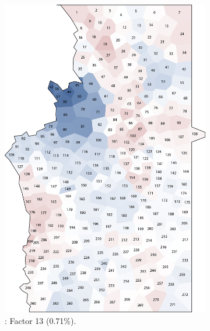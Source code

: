 \documentclass[output=paper]{LSP/langsci}
\begin{document}
\begin{figure}
\begin{subfigure}[t]{0.3\textwidth}
\includegraphics[width=\textwidth]{illustrations/pickl_fig15}
\caption{: Factor 13 (0.71\%).}
\label{fig:pickl:15}
\end{subfigure}   
~
\begin{subfigure}[t]{0.3\textwidth}

\end{subfigure}
\end{figure}
\end{document}
